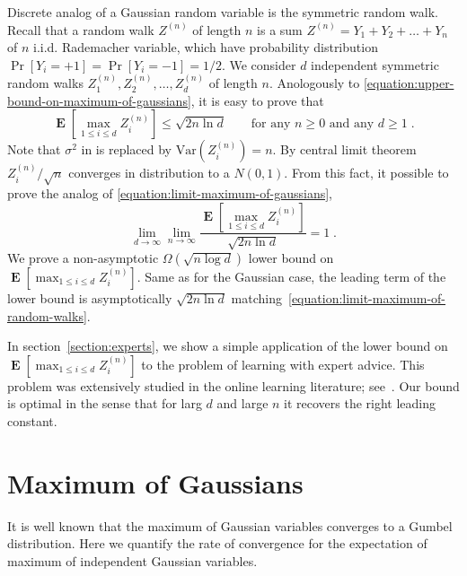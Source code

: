 \documentclass{article}
\DeclareMathOperator*{\Exp}{\mathbf{E}}
\newcommand{\Var}{\mathrm{Var}}
\begin{document}
Discrete analog of a Gaussian random variable is the symmetric random walk. Recall that a random walk $Z^{(n)}$
of length $n$ is a sum $Z^{(n)} = Y_1 + Y_2 + \dots + Y_n$ of $n$ i.i.d. Rademacher variable, which have probability distribution
$\Pr[Y_i = +1] = \Pr[Y_i = -1] = 1/2$. We consider $d$ independent symmetric random walks $Z^{(n)}_1, Z^{(n)}_2, \dots, Z^{(n)}_d$ of length $n$.
Anologously to \eqref{equation:upper-bound-on-maximum-of-gaussians}, it is easy to prove that
\begin{equation}
\label{equation:upper-bound-on-maximum-of-random-walks}
\Exp \left[ \max_{1 \le i \le d} Z^{(n)}_i \right] \le \sqrt{2 n \ln d} \qquad \text{for any $n \ge 0$ and any $d \ge 1$}\; .
\end{equation}
Note that $\sigma^2$ in is replaced by $\Var(Z^{(n)}_i) = n$. By central limit theorem $Z^{(n)}_i/\sqrt{n}$
converges in distribution to a $N(0,1)$. From this fact, it possible to prove
the analog of \eqref{equation:limit-maximum-of-gaussians},
\begin{equation}
\label{equation:limit-maximum-of-random-walks}
\lim_{d \to \infty} \lim_{n \to \infty} \frac{\Exp[\max_{1 \le i \le d} Z^{(n)}_i]}{\sqrt{2 n \ln d}} = 1 \; .
\end{equation}
We prove a non-asymptotic $\Omega(\sqrt{n \log d})$ lower bound on $\Exp[\max_{1 \le i \le d} Z^{(n)}_i]$.
Same as for the Gaussian case, the leading term of the lower bound is asymptotically $\sqrt{2 n \ln d}$
matching~\eqref{equation:limit-maximum-of-random-walks}.

In section~\ref{section:experts}, we show a simple application of the lower
bound on $\Exp[\max_{1 \le i \le d} Z^{(n)}_i]$ to the problem of learning with
expert advice.  This problem was extensively studied in the online learning
literature; see~\citep{Cesa-BianchiL06}.  Our bound is optimal in the sense
that for larg $d$ and large $n$ it recovers the right leading constant.

\section{Maximum of Gaussians}
\label{section:maximum-of-gaussians}

It is well known that the maximum of Gaussian variables converges to a Gumbel
distribution. Here we quantify the rate of convergence for the expectation of
maximum of independent Gaussian variables.
\end{document}
